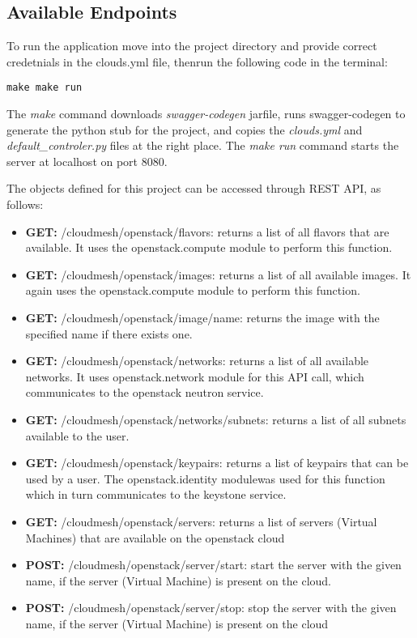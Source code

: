 \subsection{Available Endpoints}
To run the application move into the project directory and provide
correct credetnials in the clouds.yml file, thenrun the following code
in the terminal:
\begin{verbatim}
make make run
\end{verbatim}
The \emph{make} command downloads \emph{swagger-codegen} jarfile, runs
swagger-codegen to generate the python stub for the project, and
copies the \emph{clouds.yml} and \emph{default\_controler.py} files at
the right place. The \emph{make run} command starts the server at
localhost on port 8080.

The objects defined for this project can be accessed through REST API,
as follows:
\begin{itemize}
\item \textbf{GET:} /cloudmesh/openstack/flavors: returns a list of all
flavors that are available. It uses the openstack.compute module to
perform this function.

\item \textbf{GET:} /cloudmesh/openstack/images: returns a list of all
available images. It again uses the openstack.compute module to
perform this function.

\item \textbf{GET:} /cloudmesh/openstack/image/{name}: returns the image
with the specified name if there exists one.

\item \textbf{GET:} /cloudmesh/openstack/networks: returns a list of all
available networks. It uses openstack.network module for this API
call, which communicates to the openstack neutron service.

\item \textbf{GET:} /cloudmesh/openstack/networks/subnets: returns a list of
all subnets available to the user.

\item \textbf{GET:} /cloudmesh/openstack/keypairs: returns a list of keypairs
that can be used by a user. The openstack.identity modulewas used for
this function which in turn communicates to the keystone service.

\item \textbf{GET:} /cloudmesh/openstack/servers: returns a list of servers
(Virtual Machines) that are available on the openstack cloud

\item \textbf{POST:} /cloudmesh/openstack/server/start: start the server with
the given name, if the server (Virtual Machine) is present on the
cloud.

\item \textbf{POST:} /cloudmesh/openstack/server/stop: stop the server with
the given name, if the server (Virtual Machine) is present on the
cloud

\end{itemize}


